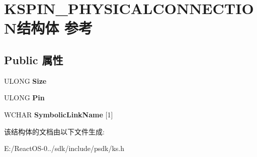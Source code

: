 \hypertarget{struct_k_s_p_i_n___p_h_y_s_i_c_a_l_c_o_n_n_e_c_t_i_o_n}{}\section{K\+S\+P\+I\+N\+\_\+\+P\+H\+Y\+S\+I\+C\+A\+L\+C\+O\+N\+N\+E\+C\+T\+I\+O\+N结构体 参考}
\label{struct_k_s_p_i_n___p_h_y_s_i_c_a_l_c_o_n_n_e_c_t_i_o_n}
\subsection*{Public 属性}
\begin{DoxyCompactItemize}
\item 
\mbox{\label{struct_k_s_p_i_n___p_h_y_s_i_c_a_l_c_o_n_n_e_c_t_i_o_n_a4108d9b16615bd5d9beedaa8974c49a8}} 
U\+L\+O\+NG {\bfseries Size}
\item 
\mbox{\label{struct_k_s_p_i_n___p_h_y_s_i_c_a_l_c_o_n_n_e_c_t_i_o_n_adefc2838105d64b41dfd3fe524b2898c}} 
U\+L\+O\+NG {\bfseries Pin}
\item 
\mbox{\label{struct_k_s_p_i_n___p_h_y_s_i_c_a_l_c_o_n_n_e_c_t_i_o_n_abfc0094a85674a0a8d6bfd943b83cbb7}} 
W\+C\+H\+AR {\bfseries Symbolic\+Link\+Name} \mbox{[}1\mbox{]}
\end{DoxyCompactItemize}


该结构体的文档由以下文件生成\+:\begin{DoxyCompactItemize}
\item 
E\+:/\+React\+O\+S-\/0../sdk/include/psdk/ks.\+h\end{DoxyCompactItemize}
